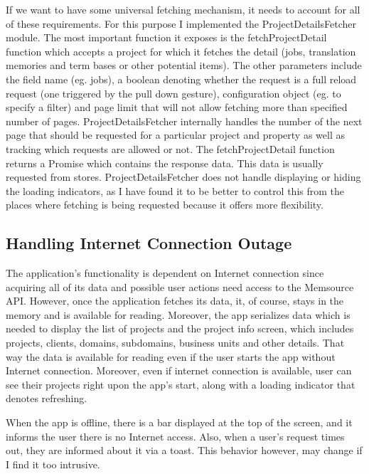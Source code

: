 If we want to have some universal fetching mechanism, it needs to account for all of these requirements. For this purpose I implemented the ProjectDetailsFetcher module. The most important function it exposes is the fetchProjectDetail function which accepts a project for which it fetches the detail (jobs, translation memories and term bases or other potential items). The other parameters include the field name (eg. jobs), a boolean denoting whether the request is a full reload request (one triggered by the pull down gesture), configuration object (eg. to specify a filter) and page limit that will not allow fetching more than specified number of pages.
ProjectDetailsFetcher internally handles the number of the next page that should be requested for a particular project and property as well as tracking which requests are allowed or not. The fetchProjectDetail function returns a Promise which contains the response data. This data is usually requested from stores. ProjectDetailsFetcher does not handle displaying or hiding the loading indicators, as I have found it to be better to control this from the places where fetching is being requested because it offers more flexibility.




\subsection{Handling Internet Connection Outage}

The application’s functionality is dependent on Internet connection since acquiring all of its data and possible user actions need access to the Memsource API. However, once the application fetches its data, it, of course, stays in the memory and is available for reading. Moreover, the app serializes data which is needed to display the list of projects and the project info screen, which includes projects, clients, domains, subdomains, business units and other details. That way the data is available for reading even if the user starts the app without Internet connection. Moreover, even if internet connection is available, user can see their projects right upon the app's start, along with a loading indicator that denotes refreshing.


When the app is offline, there is a bar displayed at the top of the screen, and it informs the user there is no Internet access. Also, when a user's request times out, they are informed about it via a toast. This behavior however, may change if I find it too intrusive. 


